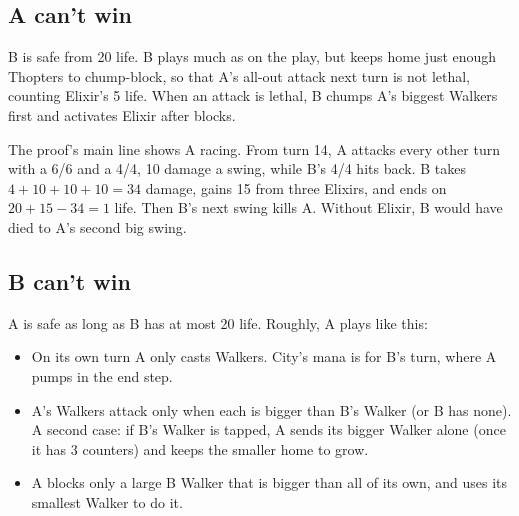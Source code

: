 \documentclass[11pt]{article}
\begin{document}
\subsection{A can't win}
B is safe from 20 life. B plays much as on the play, but keeps home
just enough Thopters to chump-block, so that A's all-out attack next
turn is not lethal, counting Elixir's 5 life. When an attack is lethal,
B chumps A's biggest Walkers first and activates Elixir after blocks.

The proof's main line shows A racing. From turn 14, A
attacks every other turn with a 6/6 and a 4/4, 10 damage a swing, while
B's 4/4 hits back. B takes $4+10+10+10 = 34$ damage, gains 15 from three
Elixirs, and ends on $20+15-34 = 1$ life. Then B's next swing kills A.
Without Elixir, B would have died to A's second big swing.

\subsection{B can't win}
A is safe as long as B has at most 20 life. Roughly, A plays like this:
\begin{itemize}
\item On its own turn A only casts Walkers. City's mana is for B's turn,
  where A pumps in the end step.
\item A's Walkers attack only when each is bigger than B's Walker (or B has none). A
  second case: if B's Walker is tapped, A sends its bigger Walker alone
  (once it has 3 counters) and keeps the smaller home to grow.
\item A blocks only a large B Walker that is bigger than all of its own,
  and uses its smallest Walker to do it.
\end{itemize}
\end{document}
